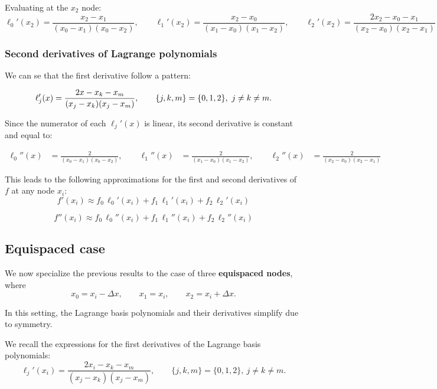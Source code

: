 Evaluating at the \(x_2\) node:
\[
\ell_0'(x_2) = \frac{x_2 - x_1}{(x_0-x_1)(x_0-x_2)}, \qquad
\ell_1'(x_2) = \frac{x_2 - x_0}{(x_1-x_0)(x_1-x_2)}, \qquad
\ell_2'(x_2) = \frac{2x_2 - x_0 - x_1}{(x_2-x_0)(x_2-x_1)}
\]

\vspace{0.5em}

\newpage

\subsubsection{Second derivatives of Lagrange polynomials}
We can se that the first derivative follow a pattern:

\[
\ell_j'(x) = \frac{2x - x_k - x_m}{(x_j - x_k)(x_j - x_m)}, \qquad \{j,k,m\} = \{0,1,2\},\ j \ne k \ne m.\\[1.5ex]
\]

\vspace{0.5em}

Since the numerator of each \(\ell_j'(x)\) is linear, its second derivative is constant and equal to:


\[
\begin{aligned}
\ell_0''(x) &= \frac{2}{(x_0-x_1)(x_0-x_2)}, \qquad
\ell_1''(x) &= \frac{2}{(x_1-x_0)(x_1-x_2)}, \qquad
\ell_2''(x) &= \frac{2}{(x_2-x_0)(x_2-x_1)}
\end{aligned}
\]

\vspace{0.5em}

This leads to the following approximations for the first and second derivatives of \(f\) at any node \(x_i\):
\[
f'(x_i) \approx f_0\,\ell_0'(x_i) + f_1\,\ell_1'(x_i) + f_2\,\ell_2'(x_i)
\]

\[
f''(x_i) \approx f_0\,\ell_0''(x_i) + f_1\,\ell_1''(x_i) + f_2\,\ell_2''(x_i)
\]

\vspace{1em}

\subsection{Equispaced case}

We now specialize the previous results to the case of three \textbf{equispaced nodes}, where
\[
x_0 = x_i - \Delta x, \qquad x_1 = x_i, \qquad x_2 = x_i + \Delta x.
\]

In this setting, the Lagrange basis polynomials and their derivatives simplify due to symmetry.


We recall the expressions for the first derivatives of the Lagrange basis polynomials:
\[
\ell_j'(x_i) = \frac{2x_i - x_k - x_m}{(x_j - x_k)(x_j - x_m)}, \qquad \{j,k,m\} = \{0,1,2\},\ j \ne k \ne m.
\]


